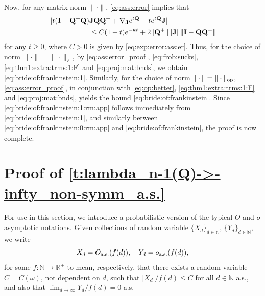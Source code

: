 \documentclass[9pt,twocolumn,twoside]{pnas-new}
\newcommand{\bbN}{{\mathbb N}}
\newcommand{\?}{\textbf{?}}
\newcommand{\op}{\textnormal{op}}
\newcommand{\as}{\textnormal{a.s.}}
\newcommand{\QQ}{\mathbf{Q}}
\newcommand{\JJ}{\mathbf{J}}
\newcommand{\II}{\mathbf{I}}
\newcommand{\RR}{\mathbb{R}}
\begin{document}
Now, for any matrix norm $\|\cdot\|$, \eqref{eq:ass:error} implies
that
\begin{align}
    \| t(\II -\QQ^+ \QQ) &\JJ \QQ \QQ^{+}
                           +  \nabla_\JJ e^{t \QQ} - t  e^{t\QQ} \JJ\|
                           \notag\\
  &\leq C(1+ t)e^{-\kappa t}
    + 2\|   \QQ^+\| \|\JJ\| \|\II - \QQ \QQ^{+}\|
    \label{eq:ass:error_proof}
\end{align}    
for any $t \geq 0$, where $C > 0$ is given by
\eqref{eq:exp:error:ass:er}. Thus, for the choice of norm
$\|\cdot\| = \|\cdot\|_{F}$, by \eqref{eq:ass:error_proof},
\eqref{eq:frob:sucks}, \eqref{eq:thm1:extra:trms:1:F} and
\eqref{eq:proj:mat:bnds}, we obtain
\eqref{eq:bride:of:frankinstein:1}.  Similarly, for the choice of norm
$\|\cdot\| = \|\cdot\|_{\op}$, \eqref{eq:ass:error_proof}, in
conjunction with \eqref{eq:op:better}, \eqref{eq:thm1:extra:trms:1:F}
and \eqref{eq:proj:mat:bnds}, yields the bound
\eqref{eq:bride:of:frankinstein}.  Since
\eqref{eq:bride:of:frankinstein:1:rm:app} follows immediately from
\eqref{eq:bride:of:frankinstein:1}, and similarly between
\eqref{eq:bride:of:frankinstein:0:rm:app} and
\eqref{eq:bride:of:frankinstein}, the proof is now complete.




\section{Proof of \cref{t:lambda_n-1(Q)->-infty_non-symm_a.s.}}
\label{sec:Thm:rand:mat:main}

For use in this section, we introduce a probabilistic version of the
typical $O$ and $o$ asymptotic notations.  Given collections of random
variable $\{X_d\}_{d \in \bbN}$, $\{Y_d\}_{d \in \bbN}$, we write
\begin{equation}\label{e:X=O_a.s.(1)_Y=o_a.s.(1)}
X_d = O_{\as}(f(d)),\quad Y_d  = o_{\as}(f(d)), 
\end{equation}
for some $f: \bbN \to \RR^+$ to mean, respectively, that there exists
a random variable $C = C(\omega)$, not dependent on $d$, such
that $|X_d|/f(d) \leq C$ for all $d \in \bbN$ a.s., and also that
$\lim_{d \rightarrow \infty}Y_d/f(d) = 0$ a.s.
\end{document}

